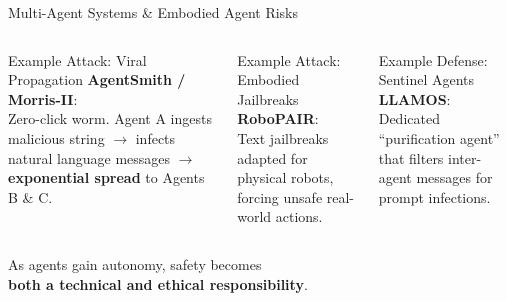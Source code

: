 \begin{frame}{Multi-Agent Systems \& Embodied Agent Risks}
  \begin{columns}[T]
    \begin{ucrcard}[UCRnavy]{Example Attack: Viral Propagation}
      \scriptsize
      \textbf{AgentSmith / Morris-II}:\\
      Zero-click worm. Agent A ingests malicious string $\to$ infects natural language messages $\to$ \textbf{exponential spread} to Agents B \& C.
    \end{ucrcard}

    \begin{ucrcard}[UCRnavy]{Example Attack: Embodied Jailbreaks}
      \scriptsize
      \textbf{RoboPAIR}:\\
      Text jailbreaks adapted for physical robots, forcing unsafe real-world actions.
    \end{ucrcard}
    
    \vspace{0.3em}
    \begin{ucrcard}[UCRnavy]{Example Defense: Sentinel Agents}
      \scriptsize
      \textbf{LLAMOS}:\\
      Dedicated ``purification agent'' that filters inter-agent messages for prompt infections.
    \end{ucrcard}
  \end{columns}

  \vspace{0.3em}
  \begin{ucrdark}[UCRnavy]
    \centering\scriptsize
    As agents gain autonomy, safety becomes\\
    \textbf{both a technical and ethical responsibility}.
  \end{ucrdark}
\end{frame}


